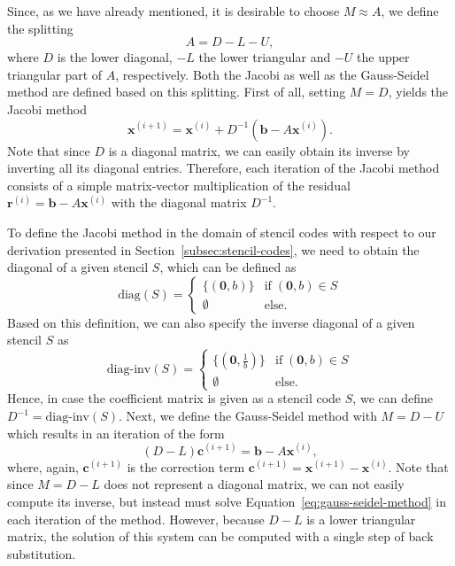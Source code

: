 Since, as we have already mentioned, it is desirable to choose $M \approx A$, we define the splitting
\begin{equation}
	A = D - L - U,
\end{equation} 
where $D$ is the lower diagonal, $-L$ the lower triangular and $-U$ the upper triangular part of $A$, respectively.
Both the Jacobi as well as the Gauss-Seidel method are defined based on this splitting.
First of all, setting $M = D$, yields the Jacobi method
\begin{equation}
	\bm{x}^{(i+1)} = \bm{x}^{(i)} + D^{-1}(\bm b - A \bm{x}^{(i)}).
	\label{eq:jacobi-method}
\end{equation}
Note that since $D$ is a diagonal matrix, we can easily obtain its inverse by inverting all its diagonal entries.
Therefore, each iteration of the Jacobi method consists of a simple matrix-vector multiplication of the residual $\bm{r}^{(i)} = \bm{b} - A \bm{x}^{(i)}$ with the diagonal matrix $D^{-1}$.

To define the Jacobi method in the domain of stencil codes with respect to our derivation presented in Section~\ref{subsec:stencil-codes}, we need to obtain the diagonal of a given stencil $S$, which can be defined as
\begin{equation}
	\text{diag}(S) = \begin{cases}
		\{(\bm{0}, b) \} & \text{if} \; (\bm 0, b) \in S \\
		\emptyset & \text{else}.
	\end{cases}
	\label{eq:stencil-diag}
\end{equation}
Based on this definition, we can also specify the inverse diagonal of a given stencil $S$ as
\begin{equation}
	\text{diag-inv}(S) = \begin{cases}
		\{(\bm{0}, \frac{1}{b}) \} & \text{if} \; (\bm 0, b) \in S \\
		\emptyset & \text{else}.
	\end{cases}
	\label{eq:stencil-diag-inv}
\end{equation}
Hence, in case  the coefficient matrix is given as a stencil code $S$, we can define $D^{-1} = \text{diag-inv}(S)$.
Next, we define the Gauss-Seidel method with $M = D - U$ which results in an iteration of the form
\begin{equation}
	(D - L) \bm{c}^{(i+1)} = \bm{b} - A \bm{x}^{(i)}, 
	\label{eq:gauss-seidel-method}
\end{equation}
where, again, $\bm{c}^{(i+1)}$ is the correction term $\bm{c}^{(i+1)} = \bm{x}^{(i+1)} - \bm{x}^{(i)}$.
Note that since $M = D - L$ does not represent a diagonal matrix, we can not easily compute its inverse, but instead must solve Equation~\eqref{eq:gauss-seidel-method} in each iteration of the method.
However, because $D - L$ is a lower triangular matrix, the solution of this system can be computed with a single step of back substitution. 

